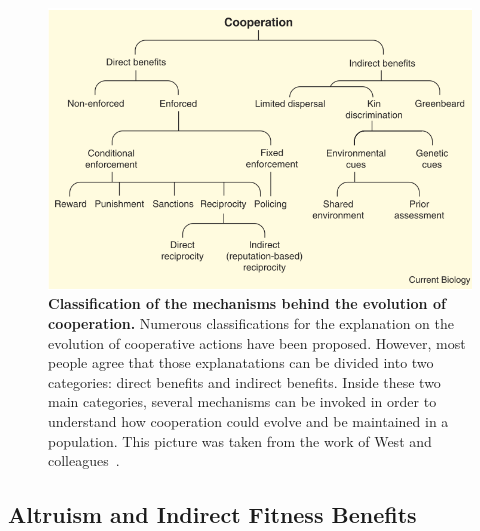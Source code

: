     \begin{figure}[hbtp]
        \begin{center}
          \includegraphics[scale = 0.30]{fig/Intro/ClassificationCooperation.png}
          \caption{\textbf{Classification of the mechanisms behind the evolution of cooperation.} Numerous classifications for the explanation on the evolution of cooperative actions have been proposed. However, most people agree that those explanatations can be divided into two categories: direct benefits and indirect benefits. Inside these two main categories, several mechanisms can be invoked in order to understand how cooperation could evolve and be maintained in a population. This picture was taken from the work of West and colleagues~\parencite{West2007}.} 
          \label{fig:CooperationExamples}
        \end{center}
    \end{figure}

  \subsection{Altruism and Indirect Fitness Benefits}

